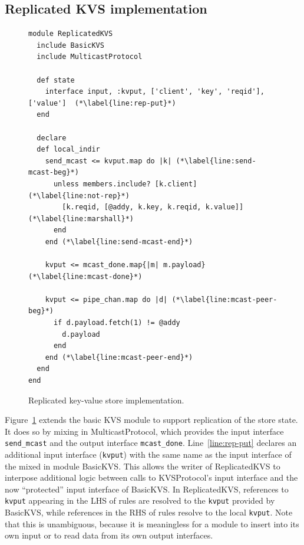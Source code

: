 \subsection{Replicated KVS implementation}
\begin{figure}[t]
\begin{scriptsize}
\begin{lstlisting}
module ReplicatedKVS
  include BasicKVS
  include MulticastProtocol

  def state
    interface input, :kvput, ['client', 'key', 'reqid'], ['value']  (*\label{line:rep-put}*)
  end

  declare
  def local_indir
    send_mcast <= kvput.map do |k| (*\label{line:send-mcast-beg}*)
      unless members.include? [k.client]  (*\label{line:not-rep}*)
        [k.reqid, [@addy, k.key, k.reqid, k.value]]   (*\label{line:marshall}*)            
      end
    end (*\label{line:send-mcast-end}*)
    
    kvput <= mcast_done.map{|m| m.payload}  (*\label{line:mcast-done}*)

    kvput <= pipe_chan.map do |d| (*\label{line:mcast-peer-beg}*)
      if d.payload.fetch(1) != @addy
        d.payload
      end
    end (*\label{line:mcast-peer-end}*)
  end
end
\end{lstlisting}
\vspace{-10pt}
\caption{Replicated key-value store implementation.}
\label{fig:kvs-repl}
\end{scriptsize}
\vspace{-2pt}
\end{figure}


Figure~\ref{fig:kvs-repl} extends the basic KVS module to support replication of
the store state.  It does so by mixing in MulticastProtocol, which provides the
input interface \texttt{send\_mcast} and the output interface
\texttt{mcast\_done}.  Line~\ref{line:rep-put} declares an additional input
interface (\texttt{kvput}) with the same name as the input interface of the
mixed in module BasicKVS.  This allows the writer of ReplicatedKVS to interpose
additional logic between calls to KVSProtocol's input interface and the now
``protected'' input interface of BasicKVS.  In ReplicatedKVS, references to
\texttt{kvput} appearing in the LHS of rules are resolved to the \texttt{kvput}
provided by BasicKVS, while references in the RHS of rules resolve to the local
\texttt{kvput}.  Note that this is unambiguous, because it is meaningless for a
module to insert into its own input or to read data from its own output
interfaces.

